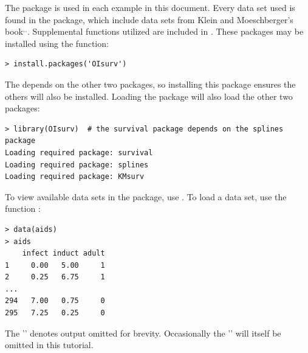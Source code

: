 \documentclass[11pt]{article}
\begin{document}
The  package is used in each example in this document. Every data set used is found in the  package, which include data sets from Klein and Moeschberger's book$^,$$^,$. Supplemental functions utilized are included in . These packages may be installed using the  function:
\begin{verbatim}
> install.packages('OIsurv')
\end{verbatim}
The  depends on the other two packages, so installing this package ensures the others will also be installed. Loading the  package will also load the other two packages:
\begin{verbatim}
> library(OIsurv)  # the survival package depends on the splines package
Loading required package: survival
Loading required package: splines
Loading required package: KMsurv
\end{verbatim}
To view available data sets in the  package, use . To load a data set, use the function :
\begin{verbatim}
> data(aids)
> aids
    infect induct adult
1     0.00   5.00     1
2     0.25   6.75     1
...
294   7.00   0.75     0
295   7.25   0.25     0
\end{verbatim}
The '' denotes output omitted for brevity. Occasionally the '' will itself be omitted in this tutorial.
\end{document}
